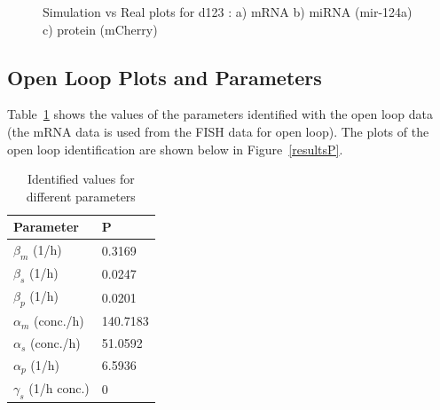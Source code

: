\documentclass{article}
\begin{document}
\begin{figure}[h!]
\caption{Simulation vs Real plots for d123 : a) mRNA b) miRNA (mir-124a) c) protein (mCherry)}
\label{resultsd123}
\end{figure}

\pagebreak

\subsection{Open Loop Plots and Parameters}

Table~\ref{paramTableOpenFish} shows the values of the parameters identified with the open loop data (the mRNA data is used from the FISH data for open loop). The plots of the open loop identification are shown below in Figure~\ref{resultsP}. 


\begin{table}[h!]
\begin{center}
\begin{tabular}{|l|l|}
\hline
Parameter & P \\\hline
$\beta_m$ (1/h) &0.3169\\\hline
$\beta_s$ (1/h) &0.0247\\\hline
$\beta_p$ (1/h) &0.0201\\\hline
$\alpha_m$ (conc./h) &140.7183\\\hline
$\alpha_s$ (conc./h) &51.0592\\\hline
$\alpha_p$ (1/h) &6.5936\\\hline
$\gamma_s$ (1/h conc.) &0\\\hline
\end{tabular}
\end{center}
\caption{Identified values for different parameters}
\label{paramTableOpenFish}
\end{table}
\end{document}
